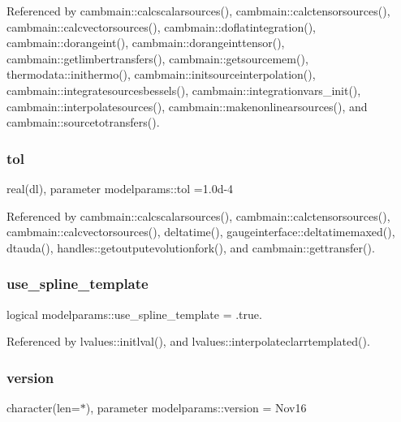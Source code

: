 Referenced by cambmain\+::calcscalarsources(), cambmain\+::calctensorsources(), cambmain\+::calcvectorsources(), cambmain\+::doflatintegration(), cambmain\+::dorangeint(), cambmain\+::dorangeinttensor(), cambmain\+::getlimbertransfers(), cambmain\+::getsourcemem(), thermodata\+::inithermo(), cambmain\+::initsourceinterpolation(), cambmain\+::integratesourcesbessels(), cambmain\+::integrationvars\+\_\+init(), cambmain\+::interpolatesources(), cambmain\+::makenonlinearsources(), and cambmain\+::sourcetotransfers().

\mbox{\label{namespacemodelparams_aa0d6cc3ee9273208296f9f9ee8ce821f}} 
\subsubsection{\texorpdfstring{tol}{tol}}
{\footnotesize\ttfamily real(dl), parameter modelparams\+::tol =1.\+0d-\/4}



Referenced by cambmain\+::calcscalarsources(), cambmain\+::calctensorsources(), cambmain\+::calcvectorsources(), deltatime(), gaugeinterface\+::deltatimemaxed(), dtauda(), handles\+::getoutputevolutionfork(), and cambmain\+::gettransfer().

\mbox{\label{namespacemodelparams_a11a5af696bd0ff15b97767839562048e}} 
\subsubsection{\texorpdfstring{use\+\_\+spline\+\_\+template}{use\_spline\_template}}
{\footnotesize\ttfamily logical modelparams\+::use\+\_\+spline\+\_\+template = .true.}



Referenced by lvalues\+::initlval(), and lvalues\+::interpolateclarrtemplated().

\mbox{\label{namespacemodelparams_ae4691876bb5eed2cdd64ae8eca39dc32}} 
\subsubsection{\texorpdfstring{version}{version}}
{\footnotesize\ttfamily character(len=$\ast$), parameter modelparams\+::version = \textquotesingle{}Nov16\textquotesingle{}}

